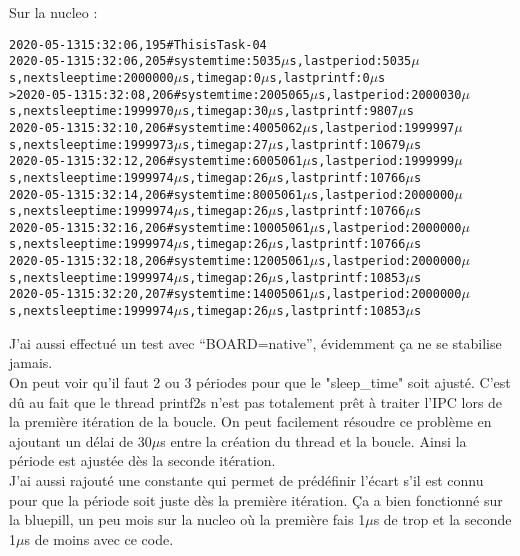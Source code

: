 Sur la nucleo :
{\tiny
\begin{alltt}
2020-05-13 15:32:06,195 # This is Task-04
2020-05-13 15:32:06,205 # system time: 5035 \(\mu\)s, last period: 5035 \(\mu\)s, next sleep time: 2000000 \(\mu\)s, time gap: 0 \(\mu\)s, last printf: 0 \(\mu\)s
> 2020-05-13 15:32:08,206 #  system time: 2005065 \(\mu\)s, last period: 2000030 \(\mu\)s, next sleep time: 1999970 \(\mu\)s, time gap: 30 \(\mu\)s, last printf: 9807 \(\mu\)s
2020-05-13 15:32:10,206 # system time: 4005062 \(\mu\)s, last period: 1999997 \(\mu\)s, next sleep time: 1999973 \(\mu\)s, time gap: 27 \(\mu\)s, last printf: 10679 \(\mu\)s
2020-05-13 15:32:12,206 # system time: 6005061 \(\mu\)s, last period: 1999999 \(\mu\)s, next sleep time: 1999974 \(\mu\)s, time gap: 26 \(\mu\)s, last printf: 10766 \(\mu\)s
2020-05-13 15:32:14,206 # system time: 8005061 \(\mu\)s, last period: 2000000 \(\mu\)s, next sleep time: 1999974 \(\mu\)s, time gap: 26 \(\mu\)s, last printf: 10766 \(\mu\)s
2020-05-13 15:32:16,206 # system time: 10005061 \(\mu\)s, last period: 2000000 \(\mu\)s, next sleep time: 1999974 \(\mu\)s, time gap: 26 \(\mu\)s, last printf: 10766 \(\mu\)s
2020-05-13 15:32:18,206 # system time: 12005061 \(\mu\)s, last period: 2000000 \(\mu\)s, next sleep time: 1999974 \(\mu\)s, time gap: 26 \(\mu\)s, last printf: 10853 \(\mu\)s
2020-05-13 15:32:20,207 # system time: 14005061 \(\mu\)s, last period: 2000000 \(\mu\)s, next sleep time: 1999974 \(\mu\)s, time gap: 26 \(\mu\)s, last printf: 10853 \(\mu\)s
\end{alltt}
}

J'ai aussi effectué un test avec \enquote{BOARD=native}, évidemment ça
ne se stabilise jamais.\\

On peut voir qu'il faut 2 ou 3 périodes pour que le "sleep\_time" soit
ajusté. C'est dû au fait que le thread printf2s n'est pas totalement
prêt à traiter l'IPC lors de la première itération de la boucle. On peut
facilement résoudre ce problème en ajoutant un délai de 30$\mu$s entre
la création du thread et la boucle. Ainsi la période est ajustée dès la
seconde itération.\\

J'ai aussi rajouté une constante qui permet de prédéfinir l'écart s'il
est connu pour que la période soit juste dès la première itération. Ça a
bien fonctionné sur la bluepill, un peu mois sur la nucleo où la
première fais 1$\mu$s de trop et la seconde 1$\mu$s de moins avec ce
code.
